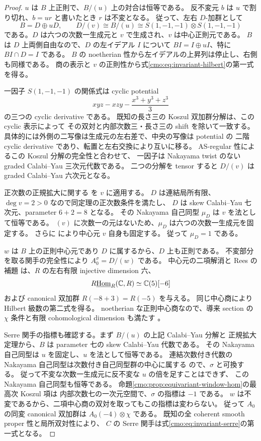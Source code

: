 \begin{proof}
$u$ は $B$ 上正則で、$B/(u)$ 上の対合は恒等である。
反不変元 $b$ は $u$ で割り切れ、$b=ur$ と書いたとき $r$ は不変となる。
従って、左右 $D$-加群として
\[
 B=D\oplus uD,\qquad D/(v)\cong B/(u)
     \cong S(1,-1,-1)\otimes S(1,-1,-1)
\]
である。$D$ は六つの次数一生成元と $v$ で生成され、$v$ は中心正則元である。
$B$ は $D$ 上両側自由なので、$D$ の左イデアル $I$ について
$BI=I\oplus uI$、特に $BI\cap D=I$ である。
$B$ の noetherian 性から左イデアルの上昇列は停止し、右側も同様である。
商の表示と $v$ の正則性から式\eqref{cmo:eq:invariant-hilbert}の第一式を得る。

一因子 $S(1,-1,-1)$ の関係式は cyclic potential
\[
 xyz-xzy-\frac{x^3+y^3+z^3}{3}
\]
の三つの cyclic derivative である。
既知の長さ三の Koszul 双加群分解は、この cyclic 表示によって
その双対と内部次数三・長さ三の shift を除いて一致する。
具体的には外側の二写像は生成元の左右差で、中央の写像は potential の
二階 cyclic derivative であり、転置と左右交換により互いに移る。
AS-regular 性によるこの Koszul 分解の完全性と合わせて、
一因子は Nakayama twist のない graded Calabi--Yau 三次元代数である。
二つの分解を tensor すると $D/(v)$ は graded Calabi--Yau 六次元となる。

正次数の正規拡大に関する
\cite[Theorem~3.1 and Remark~2.2]{CMOZhouShenLu}を $v$ に適用する。
$D$ は連結局所有限、$\deg v=2>0$ なので同定理の正次数条件を満たし、
$D$ は skew Calabi--Yau 七次元、parameter $6+2=8$ となる。
その Nakayama 自己同型 $\mu_D$ は $v$ を法として恒等である。
$(v)$ に次数一の元はないため、$\mu_D$ は六つの次数一生成元を固定する。
さらに \cite[Proposition~2.3]{CMOZhouShenLu}により中心元 $v$ 自身も固定する。
従って $\mu_D=1$ である。

$w$ は $B$ 上の正則中心元であり $D$ に属するから、$D$ 上も正則である。
不変部分を取る関手の完全性により $A_0^\sigma=D/(w)$ である。
中心元の二項解消と Rees の補題
\cite[Lemma~3.4]{CMOZhouShenLu}は、$R$ の左右有限 injective dimension 六、
\[
 R\underline{\operatorname{Hom}}_R(\mathbb C,R)\simeq\mathbb C(5)[-6]
\]
および canonical 双加群 $R(-8+3)=R(-5)$ を与える。
同じ中心商により Hilbert 級数の第二式を得る。
noetherian な正則中心商なので、導来 section の $\chi$ 条件と有限
cohomological dimension も満たす
\cite[Proposition~4.18 and Lemmas~6.1--6.2]{LP-BS}。

Serre 関手の指標も確認する。まず $B/(u)$ の上記 Calabi--Yau 分解と
正規拡大定理から、$B$ は parameter 七の skew Calabi--Yau 代数である。
その Nakayama 自己同型は $u$ を固定し、$u$ を法として恒等である。
連結次数付き代数の Nakayama 自己同型は次数付き自己同型群の中心に属する
\cite[Proposition~2.3]{CMOZhouShenLu}ので、$\sigma$ と可換する。
従って不変な次数一生成元に反不変な $u$ の倍を足すことはできず、
この Nakayama 自己同型も恒等である。
命題\ref{cmo:prop:equivariant-window-hom}の最高次 Koszul 項は
内部次数七の一次元空間で、$\sigma$ の指標は $-1$ である。
$w$ は不変であるから、二項中心商の双対を取ってもこの指標は変わらない。
従って $A_0$ の同変 canonical 双加群は $A_0(-4)\otimes\chi$ である。
既知の全 coherent smooth proper 性と局所双対性により、
$C$ の Serre 関手は式\eqref{cmo:eq:invariant-serre}の第一式となる。


\end{proof}
